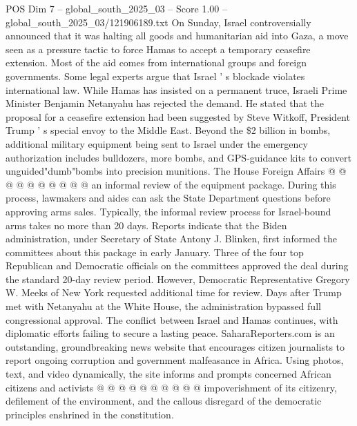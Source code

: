 \begin{textsample}{POS Dim 7 – global\_south\_2025\_03 – Score 1.00 – global\_south\_2025\_03/121906189.txt}
On Sunday, Israel controversially announced that it was halting all goods and humanitarian aid into Gaza, a move seen as a pressure tactic to force Hamas to accept a temporary ceasefire extension.
Most of the aid comes from international groups and foreign governments.
Some legal experts argue that Israel ' s blockade violates international law.
While Hamas has insisted on a permanent truce, Israeli Prime Minister Benjamin Netanyahu has rejected the demand.
He stated that the proposal for a ceasefire extension had been suggested by Steve Witkoff, President Trump ' s special envoy to the Middle East.
Beyond the \$2 billion in bombs, additional military equipment being sent to Israel under the emergency authorization includes bulldozers, more bombs, and GPS-guidance kits to convert unguided"dumb"bombs into precision munitions.
The House Foreign Affairs @ @ @ @ @ @ @ @ @ @ an informal review of the equipment package.
During this process, lawmakers and aides can ask the State Department questions before approving arms sales.
Typically, the informal review process for Israel-bound arms takes no more than 20 days.
Reports indicate that the Biden administration, under Secretary of State Antony J.
Blinken, first informed the committees about this package in early January.
Three of the four top Republican and Democratic officials on the committees approved the deal during the standard 20-day review period.
However, Democratic Representative Gregory W.
Meeks of New York requested additional time for review.
Days after Trump met with Netanyahu at the White House, the administration bypassed full congressional approval.
The conflict between Israel and Hamas continues, with diplomatic efforts failing to secure a lasting peace.
SaharaReporters.com is an outstanding, groundbreaking news website that encourages citizen journalists to report ongoing corruption and government malfeasance in Africa.
Using photos, text, and video dynamically, the site informs and prompts concerned African citizens and activists @ @ @ @ @ @ @ @ @ @ impoverishment of its citizenry, defilement of the environment, and the callous disregard of the democratic principles enshrined in the constitution.

\end{textsample}
